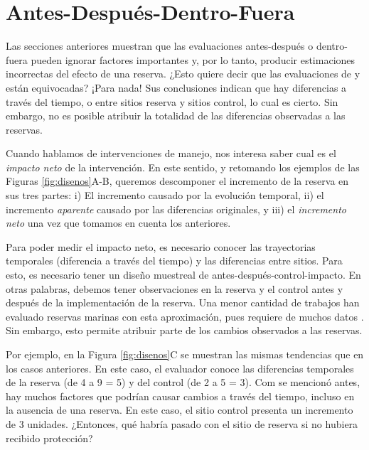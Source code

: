 \documentclass[]{krantz}
\begin{document}
\hypertarget{antes-despues-dentro-fuera}{%
\section{Antes-Después-Dentro-Fuera}\label{antes-despues-dentro-fuera}}

Las secciones anteriores muestran que las evaluaciones antes-después o
dentro-fuera pueden ignorar factores importantes y, por lo tanto,
producir estimaciones incorrectas del efecto de una reserva. ¿Esto
quiere decir que las evaluaciones de \citet{wantiez_1997} y
\citet{guidetti_2014} están equivocadas? ¡Para nada! Sus conclusiones
indican que hay diferencias a través del tiempo, o entre sitios reserva
y sitios control, lo cual es cierto. Sin embargo, no es posible atribuir
la totalidad de las diferencias observadas a las reservas.

Cuando hablamos de intervenciones de manejo, nos interesa saber cual es
el \emph{impacto neto} de la intervención. En este sentido, y retomando
los ejemplos de las Figuras \ref{fig:disenos}A-B, queremos descomponer
el incremento de la reserva en sus tres partes: i) El incremento causado
por la evolución temporal, ii) el incremento \emph{aparente} causado por
las diferencias originales, y iii) el \emph{incremento neto} una vez que
tomamos en cuenta los anteriores.

Para poder medir el impacto neto, es necesario conocer las trayectorias
temporales (diferencia a través del tiempo) y las diferencias entre
sitios. Para esto, es necesario tener un diseño muestreal de
antes-después-control-impacto. En otras palabras, debemos tener
observaciones en la reserva y el control antes y después de la
implementación de la reserva. Una menor cantidad de trabajos han
evaluado reservas marinas con esta aproximación, pues requiere de muchos
datos \citep{moland_2013, villasenorderbez_2018}. Sin embargo, esto
permite atribuir parte de los cambios observados a las reservas.

Por ejemplo, en la Figura \ref{fig:disenos}C se muestran las mismas
tendencias que en los casos anteriores. En este caso, el evaluador
conoce las diferencias temporales de la reserva (de 4 a 9 = 5) y del
control (de 2 a 5 = 3). Com se mencionó antes, hay muchos factores que
podrían causar cambios a través del tiempo, incluso en la ausencia de
una reserva. En este caso, el sitio control presenta un incremento de 3
unidades. ¿Entonces, qué habría pasado con el sitio de reserva si no
hubiera recibido protección?
\end{document}
